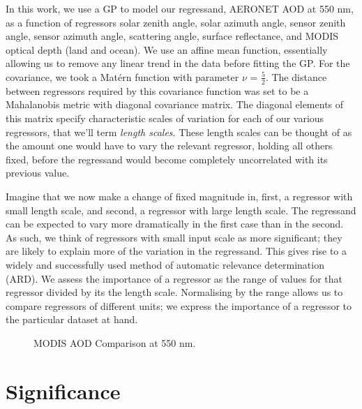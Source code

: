 \documentclass[journal]{IEEEtran}
\begin{document}
In this work, we use a GP to model our regressand, AERONET AOD at 550 nm, as a function of regressors solar zenith angle, solar azimuth angle,  sensor zenith angle, sensor azimuth angle,  scattering angle, surface reflectance, and MODIS optical depth (land and ocean). We use an affine mean function, essentially allowing us to remove any linear trend in the data before fitting the GP. For the covariance, we took a Mat\'{e}rn function with parameter $\nu$ = $\frac{5}{2}$. The distance between regressors required by this covariance function was set to be a Mahalanobis metric with diagonal covariance matrix. The diagonal elements of this matrix specify characteristic scales of variation for each of our various regressors, that we'll term \emph{length scales}. These length scales can be thought of as the amount one would have to vary the relevant regressor, holding all others fixed, before the regressand would become completely uncorrelated with its previous value.  

Imagine that we now make a change of fixed magnitude in, first, a regressor with small length scale, and second, a regressor with large length scale. The regressand can be expected to vary more dramatically in the first case than in the second. As such, we think of regressors with small input scale as more significant; they are likely to explain more of the variation in the regressand. This gives rise to a widely and successfully used \cite{GPsBook} method of automatic relevance determination (ARD). We assess the importance of a regressor as the range of values for that regressor divided by its the length scale. Normalising by the range allows us to compare regressors of different units; we express the importance of a regressor to the particular dataset at hand. 

\begin{figure*}
  \centering
  \small
{}
\hspace{-1cm}
  \caption{MODIS AOD Comparison at 550 nm.}
  \label{justfb}
\end{figure*}

\section{Significance}
\end{document}
